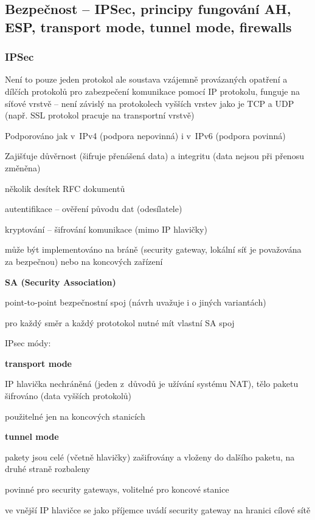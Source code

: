\subsection{Bezpečnost -- IPSec, principy fungování AH, ESP, transport mode, tunnel mode, firewalls}

\subsubsection*{IPSec}

\begin{pitemize}
	\item Není to pouze jeden protokol ale soustava vzájemně provázaných opatření a dílčích protokolů pro zabezpečení komunikace pomocí IP protokolu, funguje na síťové vrstvě -- není závislý na protokolech vyšších vrstev jako je TCP a UDP (např. SSL protokol pracuje na transportní vrstvě)
	\item Podporováno jak v IPv4 (podpora nepovinná) i v IPv6 (podpora povinná)
	\item Zajišťuje důvěrnost (šifruje přenášená data) a integritu (data nejsou při přenosu změněna)
	\item několik desítek RFC dokumentů
	\item autentifikace -- ověření původu dat (odesílatele)
	\item kryptování -- šifrování komunikace (mimo IP hlavičky)
	\item může být implementováno na bráně (security gateway, lokální síť je považována za bezpečnou) nebo na koncových zařízení 

	\item \textbf{SA (Security Association)}
	\begin{pitemize}
		\item point-to-point bezpečnostní spoj (návrh uvažuje i o jiných variantách)
		\item pro každý směr a každý prototokol nutné mít vlastní SA spoj
	\end{pitemize}
\end{pitemize}

IPsec módy:
\begin{pitemize}
	\item \textbf{transport mode}
	\begin{pitemize}
		\item IP hlavička nechráněná (jeden z důvodů je užívání systému NAT), tělo paketu šifrováno (data vyšších protokolů)
		\item použitelné jen na koncových stanicích 
	\end{pitemize}
	\item \textbf{tunnel mode}
	\begin{pitemize}
		\item pakety jsou celé (včetně hlavičky) zašifrovány a vloženy do dalšího paketu, na druhé straně rozbaleny
		\item povinné pro security gateways, volitelné pro koncové stanice
		\item ve vnější IP hlavičce se jako příjemce uvádí security gateway na hranici cílové sítě 
	\end{pitemize}
\end{pitemize}


